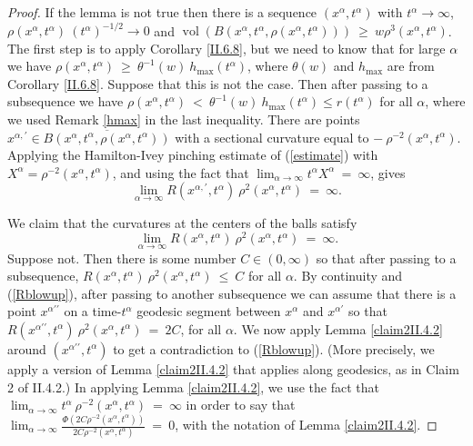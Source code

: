 \documentclass[12pt]{amsart}
\newcommand{\al}{\alpha}
\newcommand{\vol}{\operatorname{vol}}
\numberwithin{equation}{section}
\theoremstyle{plain}
\theoremstyle{definition}
\theoremstyle{remark}
\begin{document}
\begin{proof}
If the lemma is not true then there is a sequence
$(x^\al, t^\al)$ with $t^\al \rightarrow \infty$, 
$\rho(x^\al, t^\al) \: (t^\al)^{-1/2} \rightarrow 0$ and
$\vol(B(x^\al, t^\al, \rho(x^\al, t^\al))) \: \ge \: w \rho^3(x^\al, t^\al)$.
The first step is to apply Corollary \ref{II.6.8}, 
but we need to know that for large $\al$
we have 
$\rho(x^\al, t^\al) \: \ge \: \theta^{-1}(w) \: h_{\max}(t^\al)$, where
$\theta(w)$ and $h_{\max}$ are
from Corollary \ref{II.6.8}. Suppose that 
this is not the case. Then after passing to a subsequence we have
$\rho(x^\al, t^\al) \: < \: \theta^{-1}(w) \: 
h_{\max}(t^\al) \le r(t^{\al})$ for all $\al$,
where we used Remark \ref{hmax} in the last inequality.
There are points
$x^{\al,\prime} \in \overline{B(x^\al, t^\al, \rho(x^\al, t^\al))}$ 
with a sectional curvature
equal to  $- \: \rho^{-2}(x^\al, t^\al)$.
Applying the Hamilton-Ivey pinching estimate of
(\ref{estimate}) with $X^\al = \rho^{-2}(x^\al, t^\al)$, and using the fact 
that
$\lim_{\al \rightarrow \infty} t^\al X^\al \: = \:  \infty$, gives
\begin{equation} \label{Rblowup}
\lim_{\al \rightarrow \infty} 
R(x^{\al,\prime}, t^\al) \: \rho^2(x^\al, t^\al) \: = \: \infty.
\end{equation}

We claim that
the curvatures at the centers of the balls satisfy
\begin{equation}
\lim_{\al \rightarrow \infty} R(x^{\al}, t^\al) \: \rho^2(x^\al, t^\al) \: = \: \infty.
\end{equation} 
Suppose not. Then there is some number $C \in (0, \infty)$ so that
after passing to a subsequence, 
$R(x^{\al}, t^\al) \: \rho^2(x^\al, t^\al) \: \le \: C$ for all $\al$.
By continuity and (\ref{Rblowup}), 
after passing to another subsequence we can assume that there is a point
$x^{\alpha\prime \prime}$ on a time-$t^\al$ geodesic segment between 
$x^{\alpha}$ and $x^{\alpha \prime}$ so that
$R(x^{\al \prime \prime}, t^\al) \: \rho^2(x^\al, t^\al) \: = \: 2C$,
for all $\al$. We now apply Lemma \ref{claim2II.4.2} around
$(x^{\al \prime \prime}, t^\al)$ to get a contradiction to
(\ref{Rblowup}).
(More precisely, we apply a version of 
Lemma \ref{claim2II.4.2} that applies along geodesics, as in Claim 2 of 
II.4.2.) In applying Lemma \ref{claim2II.4.2}, we use the fact that
$\lim_{\al \rightarrow \infty} t^\al \: \rho^{-2}(x^\al, t^\al) \: = \:  
\infty$ in order to say that
$\lim_{\al \rightarrow \infty} 
\frac{\Phi(2C\rho^{-2}(x^\al, t^\al))}{2C\rho^{-2}(x^\al, t^\al)} \: = \: 0$,
with the notation of Lemma \ref{claim2II.4.2}.


\end{proof}
\end{document}
